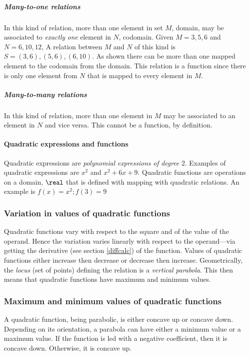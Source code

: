 \subparagraph{Many-to-one relations}
In this kind of relation, more than one element in set $M$, domain, may be associated to \emph{exactly one} element in $N$, codomain.
Given $M = {3, 5, 6}$ and $N = {6, 10, 12}$,
A relation between $M$ and $N$ of this kind is $S = {(3, 6), (5, 6), (6, 10)}$.
As shown there can be more than one mapped element to the codomain from the domain.
This relation is a function since there is only one element from $N$ that is mapped to every element in $M$.

\subparagraph{Many-to-many relations}
In this kind of relation, more than one element in $M$ may be associated to an element in $N$ and vice versa.
This cannot be a function, by definition.

\paragraph{Quadratic expressions and functions}
Quadratic expressions are \emph{polynomial expressions of degree $2$}.
Examples of quadratic expressions are $x^2$ and $x^2+6x+9$.
Quadratic functions are operations on a domain, $\real$ that is defined with mapping with quadratic relations.
An example is $f(x) = x^2; f(3) = 9$

\subsubsection{Variation in values of quadratic functions}
Quadratic functions vary with respect to the square and of the value of the operand.
Hence the variation varies linearly with respect to the operand---via getting the derivative (see section \ref{diffcalc}) of the function.
Values of quadratic functions either increase then decrease or decrease then increase.
Geometrically, the \emph{locus} (set of points) defining the relation is a \emph{vertical parabola}.
This then means that quadratic functions have maximum and minimum values.

\subsubsection{Maximum and minimum values of quadratic functions}
A quadratic function, being parabolic, is either concave up or concave down.
Depending on its orientation, a parabola can have either a minimum value or a maximum value.
If the function is led with a negative coefficient, then it is concave down.
Otherwise, it is concave up.

